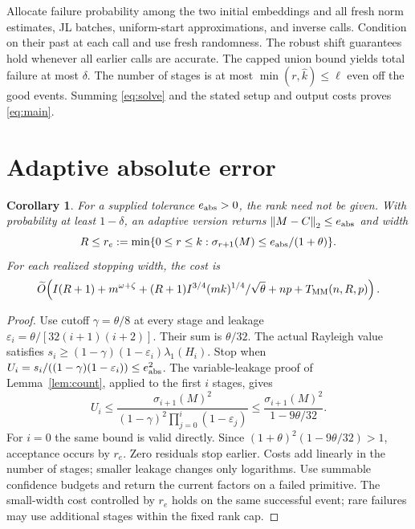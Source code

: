 \documentclass[11pt]{article}
\newtheorem{corollary}[theorem]{Corollary}
\newcommand{\norm}[1]{\left\lVert#1\right\rVert}
\newcommand{\tO}{\widetilde O}
\newcommand{\MM}{T_{\rm MM}}
\begin{document}
Allocate failure probability among the two initial embeddings and all
fresh norm estimates, JL batches, uniform-start approximations, and
inverse calls. Condition on their past at each call and use fresh
randomness. The robust shift guarantees hold whenever all earlier
calls are accurate. The capped union bound yields total failure at
most \(\delta\). The number of stages is at most
\(\min(r,\widehat k)\leq\ell\) even off the good events.
Summing \eqref{eq:solve} and the stated setup and output costs proves
\eqref{eq:main}.

\section{Adaptive absolute error}
\begin{corollary}\label{cor:absolute}
For a supplied tolerance \(e_{\rm abs}>0\), the rank need not be given.
With probability at least \(1-\delta\), an adaptive version returns
\(\norm{M-C}_2\leq e_{\rm abs}\) and width
\[
 R\leq r_e:=\min\{0\leq r\leq k:
                         \sigma_{r+1}(M)\leq e_{\rm abs}/(1+\theta)\}.
\]
For each realized stopping width, the cost is
\[
 \tO\!\left(I(R+1)+m^{\omega+\zeta}
  +(R+1)I^{3/4}(mk)^{1/4}/\sqrt\theta
  +np+\MM(n,R,p)\right).
\]
\end{corollary}
\begin{proof}
Use cutoff \(\gamma=\theta/8\) at every stage and leakage
\(\varepsilon_i=\theta/[32(i+1)(i+2)]\).
Their sum is \(\theta/32\). The actual Rayleigh value satisfies
\(s_i\geq(1-\gamma)(1-\varepsilon_i)\lambda_1(H_i)\).
Stop when
\(U_i=s_i/((1-\gamma)(1-\varepsilon_i))\leq e_{\rm abs}^2\).
The variable-leakage proof of Lemma~\ref{lem:count}, applied to the
first \(i\) stages, gives
\[
 U_i\leq
 \frac{\sigma_{i+1}(M)^2}
 {(1-\gamma)^2\prod_{j=0}^{i}(1-\varepsilon_j)}
 \leq\frac{\sigma_{i+1}(M)^2}{1-9\theta/32}.
\]
For \(i=0\) the same bound is valid directly.
Since \((1+\theta)^2(1-9\theta/32)>1\), acceptance occurs by \(r_e\).
Zero residuals stop earlier. Costs add linearly in the number of stages;
smaller leakage changes only logarithms.
Use summable confidence budgets and return the current factors on a
failed primitive. The small-width cost controlled by \(r_e\) holds on
the same successful event; rare failures may use additional stages
within the fixed rank cap.
\end{proof}
\end{document}
